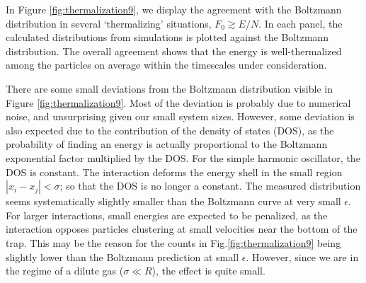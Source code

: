 \documentclass[a4paper, onecolumn]{revtex4-1}
\begin{document}
In Figure \ref{fig:thermalization9}, we display the agreement with the Boltzmann distribution in
several `thermalizing' situations, $F_0\gtrsim E/N$.  In each panel, the calculated distributions
from simulations is plotted against the Boltzmann distribution.  The overall agreement shows that
the energy is well-thermalized among the particles on average within the timescales under
consideration.


There are some small deviations from the Boltzmann distribution visible in Figure
\ref{fig:thermalization9}.  Most of the deviation is probably due to numerical noise, and
unsurprising given our small system sizes.  However, some deviation is also expected due to the
contribution of the density of states (DOS), as the probability of finding an energy is actually
proportional to the Boltzmann exponential factor multiplied by the DOS.  For the simple harmonic
oscillator, the DOS is constant.  The interaction deforms the energy shell in the small region
$|x_i-x_j|<\sigma$; so that the DOS is no longer a constant.  The measured distribution seems
systematically slightly smaller than the Boltzmann curve at very small $\epsilon$.  For larger
interactions, small energies are expected to be penalized, as the interaction opposes particles
clustering at small velocities near the bottom of the trap.  This may be the reason for the counts
in Fig.\ref{fig:thermalization9} being slightly lower than the Boltzmann prediction at small
$\epsilon$.  However, since we are in the regime of a dilute gas ($\sigma\ll R$), the effect is
quite small.

\end{document}
